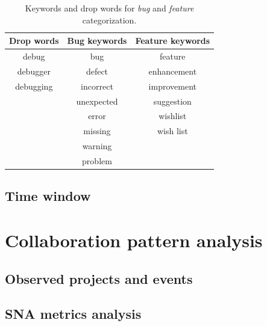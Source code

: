 \begin{table}
    \centering
        \begin{tabular}{| c | c | c |}
            \hline
            \textbf{Drop words} & \textbf{Bug keywords} & \textbf{Feature keywords} \\
            \hline \hline
            debug & bug & feature \\
            debugger & defect & enhancement \\
            debugging & incorrect & improvement \\
             & unexpected & suggestion \\
             & error & wishlist \\
             & missing & wish list \\
             & warning & \\
             & problem & \\
            \hline
        \end{tabular}
    \caption{Keywords and drop words for \textit{bug} and \textit{feature} categorization.}
    \label{tab:keywords}
\end{table}

\subsection{Time window}





\section{Collaboration pattern analysis}
\subsection{Observed projects and events}
\subsection{SNA metrics analysis}
